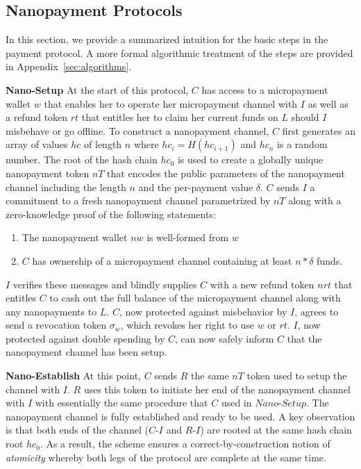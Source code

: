 \subsection{Nanopayment Protocols}
In this section, we provide a summarized intuition for the basic steps in the
payment protocol. A more formal algorithmic treatment of the steps are provided
in Appendix~\ref{sec:algorithms}.

\textbf{Nano-Setup} At the start of this protocol, $C$ has access to a
micropayment wallet $w$ that enables her to operate her micropayment channel
with $I$ as well as a refund token $rt$ that entitles her to claim her current
funds on $L$ should $I$ misbehave or go offline. To construct a nanopayment
channel, $C$ first generates an array of values $hc$ of length $n$ where
$hc_i = H(hc_{i+1})$ and $hc_n$ is a random number. The root of the hash chain
$hc_0$ is used to create a globally unique nanopayment token $nT$ that encodes
the public parameters of the nanopayment channel including the length $n$ and
the per-payment value $\delta$. $C$ sends $I$ a commitment to a fresh
nanopayment channel parametrized by $nT$ along with a zero-knowledge proof of
the following statements:

\begin{enumerate}
\item The nanopayment wallet $nw$ is well-formed from $w$
\item $C$ has ownership of a micropayment channel containing at least $n *
  \delta$ funds.
\end{enumerate}

$I$ verifies these messages and blindly supplies $C$ with a new refund token $nrt$
that entitles $C$ to cash out the full balance of the micropayment channel along
with any nanopayments to $L$. $C$, now protected against misbehavior by $I$,
agrees to send a revocation token $\sigma_w$, which revokes her right to use $w$
or $rt$. $I$, now protected against double spending by $C$, can now safely
inform $C$ that the nanopayment channel has been setup.

\textbf{Nano-Establish} At this point, $C$ sends $R$ the same $nT$ token used to
setup the channel with $I$. $R$ uses this token to initiate her end of the
nanopayment channel with $I$ with essentially the same procedure that $C$ used
in $Nano$-$Setup$. The nanopayment channel is fully established and ready to be
used. A key observation is that both ends of the channel ($C$-$I$ and $R$-$I$)
are rooted at the same hash chain root $hc_0$. As a result, the scheme ensures a
correct-by-construction notion of \emph{atomicity} whereby both legs of the
protocol are complete at the same time.

